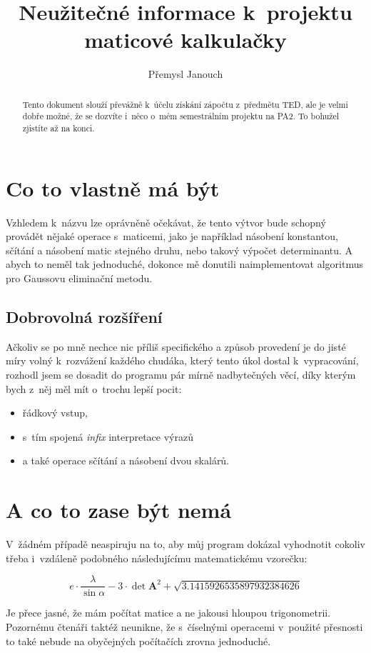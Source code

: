 \documentclass[a4paper,11pt]{article}
\title{Neužitečné informace k~projektu maticové kalkulačky}
\author{Přemysl Janouch}
\begin{document}
\maketitle

\begin{abstract}
Tento dokument slouží převážně k~účelu získání zápočtu z~předmětu TED, ale je velmi dobře možné, že se dozvíte i~něco o~mém semestrálním projektu na PA2. To bohužel zjistíte až na konci.
\end{abstract}

\section{Co to vlastně má být}
Vzhledem k~názvu  lze oprávněně očekávat, že tento výtvor bude schopný provádět nějaké operace s~maticemi, jako je například násobení konstantou, sčítání a násobení matic stejného druhu, nebo takový výpočet determinantu. A abych to neměl tak jednoduché, dokonce mě donutili naimplementovat algoritmus pro Gaussovu eliminační metodu.

\subsection{Dobrovolná rozšíření}
Ačkoliv se po mně nechce nic příliš specifického a způsob provedení je do jisté míry volný k~rozvážení každého chudáka, který tento úkol dostal k~vypracování, rozhodl jsem se dosadit do programu pár mírně nadbytečných věcí, díky kterým bych z~něj měl mít o~trochu lepší pocit:

\begin{itemize}
\item řádkový vstup,
\item s~tím spojená \emph{infix} interpretace výrazů
\item a také operace sčítání a násobení dvou skalárů.
\end{itemize}

\section{A co to zase být nemá}
V~žádném případě neaspiruju na to, aby můj program dokázal vyhodnotit cokoliv třeba i~vzdáleně podobného následujícímu matematickému vzorečku:

\[e \cdot \frac{\lambda}{\sin \alpha} - 3 \cdot \det \textbf{A}^2 + \sqrt{3.1415926535897932384626}\]

Je přece jasné, že mám počítat matice a ne jakousi hloupou trigonometrii. Pozornému čtenáři taktéž neunikne, že s~číselnými operacemi v~použité přesnosti to také nebude na obyčejných počítačích zrovna jednoduché.
\end{document}
